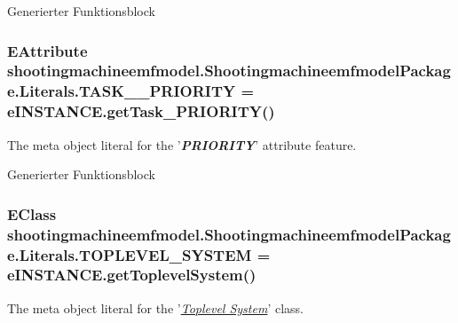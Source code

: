 Generierter Funktionsblock \hypertarget{interfaceshootingmachineemfmodel_1_1_shootingmachineemfmodel_package_1_1_literals_a6860394b9f9e403b44382ad8d19b97b3}{
\subsubsection[{T\-A\-S\-K\-\_\-\-\_\-\-P\-R\-I\-O\-R\-I\-T\-Y}]{\setlength{\rightskip}{0pt plus 5cm}E\-Attribute shootingmachineemfmodel.\-Shootingmachineemfmodel\-Package.\-Literals.\-T\-A\-S\-K\-\_\-\-\_\-\-P\-R\-I\-O\-R\-I\-T\-Y = e\-I\-N\-S\-T\-A\-N\-C\-E.\-get\-Task\-\_\-\-P\-R\-I\-O\-R\-I\-T\-Y()}}\label{interfaceshootingmachineemfmodel_1_1_shootingmachineemfmodel_package_1_1_literals_a6860394b9f9e403b44382ad8d19b97b3}
The meta object literal for the '{\itshape {\bfseries P\-R\-I\-O\-R\-I\-T\-Y}}' attribute feature.

Generierter Funktionsblock \hypertarget{interfaceshootingmachineemfmodel_1_1_shootingmachineemfmodel_package_1_1_literals_a943e2666e6ae22cc7e941dcdfbd58760}{
\subsubsection[{T\-O\-P\-L\-E\-V\-E\-L\-\_\-\-S\-Y\-S\-T\-E\-M}]{\setlength{\rightskip}{0pt plus 5cm}E\-Class shootingmachineemfmodel.\-Shootingmachineemfmodel\-Package.\-Literals.\-T\-O\-P\-L\-E\-V\-E\-L\-\_\-\-S\-Y\-S\-T\-E\-M = e\-I\-N\-S\-T\-A\-N\-C\-E.\-get\-Toplevel\-System()}}\label{interfaceshootingmachineemfmodel_1_1_shootingmachineemfmodel_package_1_1_literals_a943e2666e6ae22cc7e941dcdfbd58760}
The meta object literal for the '\hyperlink{classshootingmachineemfmodel_1_1impl_1_1_toplevel_system_impl}{{\itshape Toplevel System}}' class.

